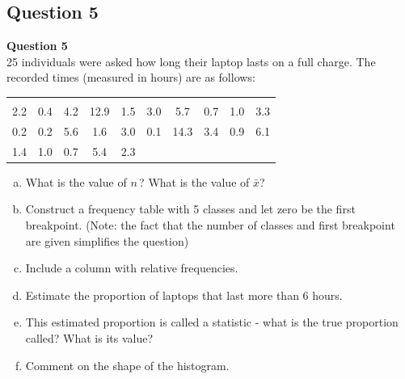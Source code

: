 \documentclass[compress]{beamer}        %
\makeatletter
\newcommand{\tcb}{\textcolor{beamer@blendedblue}}
\makeatother
\begin{document}
\subsection{Question 5}
\begin{frame}{\bf \tcb{Question 5}\\[-0.8cm]}
25 individuals were asked how long their laptop lasts on a full charge. The recorded times (measured in hours) are as follows:
\begin{center}
\begin{tabular}{|cccccccccc|}
\hline
&&&&&&&&&\\[-0.4cm]
2.2 & 0.4 & 4.2 & 12.9 & 1.5 & 3.0 & 5.7  & 0.7 & 1.0 & 3.3 \\
0.2 & 0.2 & 5.6 &  1.6 & 3.0 & 0.1 & 14.3 & 3.4 & 0.9 & 6.1 \\
1.4 & 1.0 & 0.7 & 5.4  & 2.3 &&&&&\\
\hline
\end{tabular}
\end{center}
\begin{enumerate}[a)]\itemsep0.1cm
\item What is the value of $n$\,? What is the value of $\bar x$?
\item Construct a frequency table with 5 classes and let zero be the first breakpoint.
    {\footnotesize(Note: the fact that the number of classes and first breakpoint are given simplifies the question)}
\item Include a column with relative frequencies.
\item Estimate the proportion of laptops that last more than 6 hours.
\item This estimated proportion is called a statistic - what is the true proportion called? What is its value?
\item Comment on the shape of the histogram.
\end{enumerate}
\end{frame}
\end{document}
